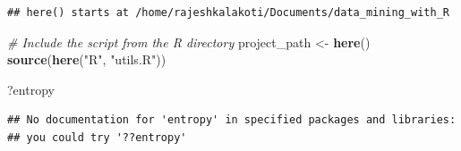 \documentclass[
]{article}
\newenvironment{Shaded}{\begin{snugshade}}{\end{snugshade}}
\newcommand{\CommentTok}[1]{\textcolor[rgb]{0.56,0.35,0.01}{\textit{#1}}}
\newcommand{\FunctionTok}[1]{\textcolor[rgb]{0.13,0.29,0.53}{\textbf{#1}}}
\newcommand{\NormalTok}[1]{#1}
\newcommand{\OtherTok}[1]{\textcolor[rgb]{0.56,0.35,0.01}{#1}}
\newcommand{\StringTok}[1]{\textcolor[rgb]{0.31,0.60,0.02}{#1}}
\begin{document}
\begin{verbatim}
## here() starts at /home/rajeshkalakoti/Documents/data_mining_with_R
\end{verbatim}

\begin{Shaded}
\begin{Highlighting}[]
\CommentTok{\# Include the script from the R directory}
\NormalTok{project\_path }\OtherTok{\textless{}{-}} \FunctionTok{here}\NormalTok{()}
\FunctionTok{source}\NormalTok{(}\FunctionTok{here}\NormalTok{(}\StringTok{"R"}\NormalTok{, }\StringTok{"utils.R"}\NormalTok{))}
\end{Highlighting}
\end{Shaded}

\begin{Shaded}
\begin{Highlighting}[]
\NormalTok{?entropy}
\end{Highlighting}
\end{Shaded}

\begin{verbatim}
## No documentation for 'entropy' in specified packages and libraries:
## you could try '??entropy'
\end{verbatim}
\end{document}
